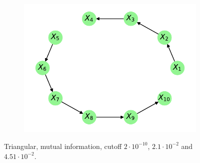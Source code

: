 \documentclass[../Thesis.tex]{subfiles}
\begin{document}
\begin{figure}[H]
\begin{subfigure}[t]{0.49\textwidth}
        \caption{}
    \end{subfigure}
    \\[\baselineskip]
    \begin{subfigure}[t]{0.49\textwidth}
        \centering
        \includegraphics[width=.95\linewidth]{figures/Gaussian Chain Theoretical/Chain graph from triangular G obs - MI - cutoff 4_51e-2.pdf}
        \caption{}
    \end{subfigure}
    \caption{Triangular, mutual information, cutoff $2\cdot 10^{-10}$, $2.1 \cdot 10^{-2}$ and $4.51 \cdot 10^{-2}$.}
    \label{fig:Gaussian chain symmetric G_obs using mutual information different cutoff}
\end{figure}


\newpage
\end{document}
